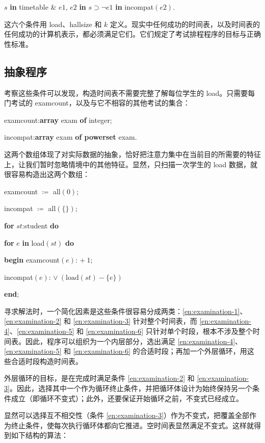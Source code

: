 \documentclass[twoside,11pt,fontset=none]{ctexbook}
\begin{document}
\quad $s$ \textbf{in} timetable \& $e1$, $e2$ \textbf{in} $s \supset\neg e1$ \textbf{in} incompat$(e2)$.

这六个条件用 load、hallsize 和 $k$ 定义。现实中任何成功的时间表，以及时间表的任何成功的计算机表示，都必须满足它们。它们规定了考试排程程序的目标与正确性标准。

\subsection{抽象程序}

考察这些条件可以发现，构造时间表不需要完整了解每位学生的 load。只需要每门考试的 examcount，以及与它不相容的其他考试的集合：

\quad examcount:\textbf{array} exam \textbf{of} integer;

\quad incompat:\textbf{array} exam \textbf{of powerset} exam.

\noindent
这两个数组体现了对实际数据的抽象，恰好把注意力集中在当前目的所需要的特征上，让我们暂时忽略情境中的其他特征。显然，只扫描一次学生的 load 数据，就很容易构造出这两个数组：

\quad examcount $\coloneq$ all$(0)$;

\quad incompat $\coloneq$ all$(\{\})$;

\quad \textbf{for} $st$:student \textbf{do}

\quad \quad \textbf{for} $e$ \textbf{in} load$(st)$ \textbf{do}

\quad \quad \quad \textbf{begin} examcount$(e)$: $+\ 1$;

\quad \quad \quad \quad incompat$(e)$: $\vee\ (\text{load}(st) - \{e\})$

\quad \quad \quad \textbf{end};

寻求解法时，一个简化因素是这些条件很容易分成两类：\ref{en:examination-1}、\ref{en:examination-2} 和 \ref{en:examination-3} 针对整个时间表，而 \ref{en:examination-4}、\ref{en:examination-5} 和 \ref{en:examination-6} 只针对单个时段，根本不涉及整个时间表。因此，程序可以组织为一个内层部分，选出满足 \ref{en:examination-4}、\ref{en:examination-5} 和 \ref{en:examination-6} 的合适时段；再加一个外层循环，用这些合适时段构造时间表。

外层循环的目标，是在完成时满足条件 \ref{en:examination-2} 和 \ref{en:examination-3}。因此，选择其中一个作为循环终止条件，并把循环体设计为始终保持另一个条件成立（即循环不变式）；此外，还要保证开始循环之前，不变式已经成立。

显然可以选择互不相交性（条件 \ref{en:examination-3}）作为不变式，把覆盖全部作为终止条件，使每次执行循环体都向它推进。空时间表显然满足不变式。这样就得到如下结构的算法：
\end{document}
